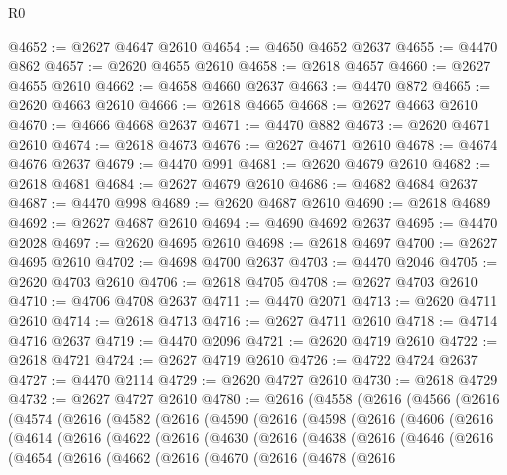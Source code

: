 \begin{lexlean}{R0}
\begin{coremodule}
@4652 := @2627 @4647 @2610
@4654 := @4650 @4652 @2637
@4655 := @4470 @862
@4657 := @2620 @4655 @2610
@4658 := @2618 @4657
@4660 := @2627 @4655 @2610
@4662 := @4658 @4660 @2637
@4663 := @4470 @872
@4665 := @2620 @4663 @2610
@4666 := @2618 @4665
@4668 := @2627 @4663 @2610
@4670 := @4666 @4668 @2637
@4671 := @4470 @882
@4673 := @2620 @4671 @2610
@4674 := @2618 @4673
@4676 := @2627 @4671 @2610
@4678 := @4674 @4676 @2637
@4679 := @4470 @991
@4681 := @2620 @4679 @2610
@4682 := @2618 @4681
@4684 := @2627 @4679 @2610
@4686 := @4682 @4684 @2637
@4687 := @4470 @998
@4689 := @2620 @4687 @2610
@4690 := @2618 @4689
@4692 := @2627 @4687 @2610
@4694 := @4690 @4692 @2637
@4695 := @4470 @2028
@4697 := @2620 @4695 @2610
@4698 := @2618 @4697
@4700 := @2627 @4695 @2610
@4702 := @4698 @4700 @2637
@4703 := @4470 @2046
@4705 := @2620 @4703 @2610
@4706 := @2618 @4705
@4708 := @2627 @4703 @2610
@4710 := @4706 @4708 @2637
@4711 := @4470 @2071
@4713 := @2620 @4711 @2610
@4714 := @2618 @4713
@4716 := @2627 @4711 @2610
@4718 := @4714 @4716 @2637
@4719 := @4470 @2096
@4721 := @2620 @4719 @2610
@4722 := @2618 @4721
@4724 := @2627 @4719 @2610
@4726 := @4722 @4724 @2637
@4727 := @4470 @2114
@4729 := @2620 @4727 @2610
@4730 := @2618 @4729
@4732 := @2627 @4727 @2610
@4780 := @2616
    (@4558
      (@2616
        (@4566
          (@2616
            (@4574
              (@2616
                (@4582
                  (@2616
                    (@4590
                      (@2616
                        (@4598
                          (@2616
                            (@4606
                              (@2616
                                (@4614
                                  (@2616
                                    (@4622
                                      (@2616
                                        (@4630
                                          (@2616
                                            (@4638
                                              (@2616
                                                (@4646
                                                  (@2616
                                                    (@4654
                                                      (@2616
                                                        (@4662
                                                          (@2616
                                                            (@4670
                                                              (@2616
                                                                (@4678
                                                                  (@2616

\end{coremodule}
\end{lexlean}
